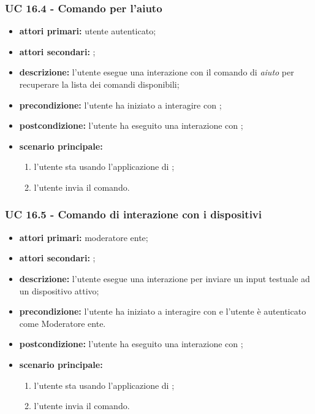 	\subsubsection{UC 16.4 - Comando per l'aiuto}


	\begin{itemize}
		\item \textbf{attori primari:} utente autenticato;
		\item \textbf{attori secondari:} ;
		\item \textbf{descrizione:} l'utente esegue una interazione con il comando di \textit{aiuto} per recuperare la lista dei comandi disponibili;
		\item \textbf{precondizione:} l'utente ha iniziato a interagire con ;
		\item \textbf{postcondizione:} l'utente ha eseguito una interazione con ;
		\item \textbf{scenario principale:}
		\begin{enumerate}
			\item l'utente sta usando l'applicazione di ;
			\item l'utente invia il comando.
		\end{enumerate}
	\end{itemize}


	\subsubsection{UC 16.5 - Comando di interazione con i dispositivi}

	\begin{itemize}
		\item \textbf{attori primari:} moderatore ente;
		\item \textbf{attori secondari:} ;
		\item \textbf{descrizione:} l'utente esegue una interazione per inviare un input testuale ad un dispositivo attivo;
		\item \textbf{precondizione:} l'utente ha iniziato a interagire con  e l'utente è autenticato come Moderatore ente.
		\item \textbf{postcondizione:} l'utente ha eseguito una interazione con ;
		\item \textbf{scenario principale:}
		\begin{enumerate}
			\item l'utente sta usando l'applicazione di ;
			\item l'utente invia il comando.
		\end{enumerate}
	\end{itemize}

